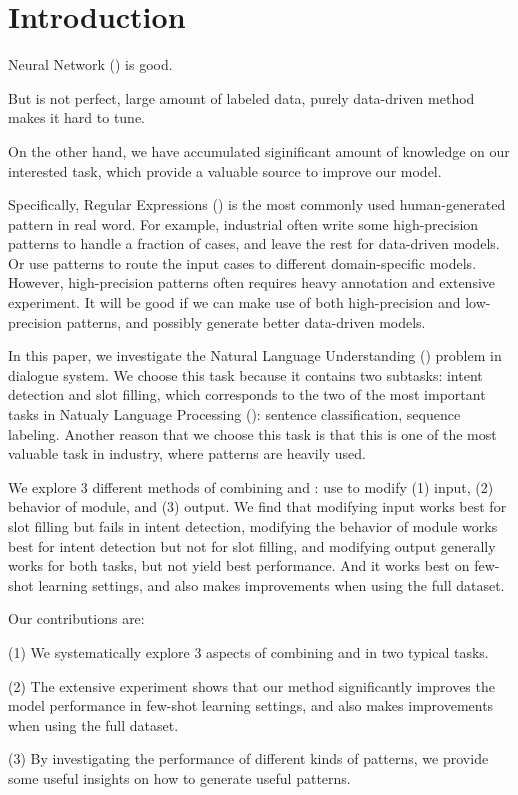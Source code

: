 \section{Introduction}
Neural Network (\NN) is good.

But \NN is not perfect, large amount of labeled data, purely data-driven method makes it hard to tune.

On the other hand, we have accumulated siginificant amount of knowledge on our interested task, which provide a valuable source to improve our model.

Specifically, Regular Expressions (\RE) is the most commonly used human-generated pattern in real word. For example, industrial often write some high-precision \RE patterns to handle a fraction of cases, and leave the rest for data-driven models. Or use \RE patterns to route the input cases to different domain-specific models. However, high-precision patterns often requires heavy annotation and extensive experiment. It will be good if we can make use of both high-precision and low-precision patterns, and possibly generate better data-driven models.

In this paper, we investigate the Natural Language Understanding (\NLU) problem in dialogue system. We choose this task because it contains two subtasks: intent detection and slot filling, which corresponds to the two of the most important tasks in Natualy Language Processing (\NLP): sentence classification, sequence labeling. Another reason that we choose this task is that this is one of the most valuable \NLP task in industry, where \RE patterns are heavily used.

We explore 3 different methods of combining \RE and \NN: use \RE to modify (1) \NN input, (2) behavior of \NN module, and (3) \NN output. We find that modifying \NN input works best for slot filling but fails in intent detection, modifying the behavior of \NN module works best for intent detection but not for slot filling, and modifying \NN output generally works for both tasks, but not yield best performance. And it works best on few-shot learning settings, and also makes improvements when using the full dataset.

Our contributions are: 

(1) We systematically explore 3 aspects of combining \RE and \NN in two typical \NLP tasks.

(2) The extensive experiment shows that our method significantly improves the model performance in few-shot learning settings, and also makes improvements when using the full dataset.

(3) By investigating the performance of different kinds of \RE patterns, we provide some useful insights on how to generate useful \RE patterns.

